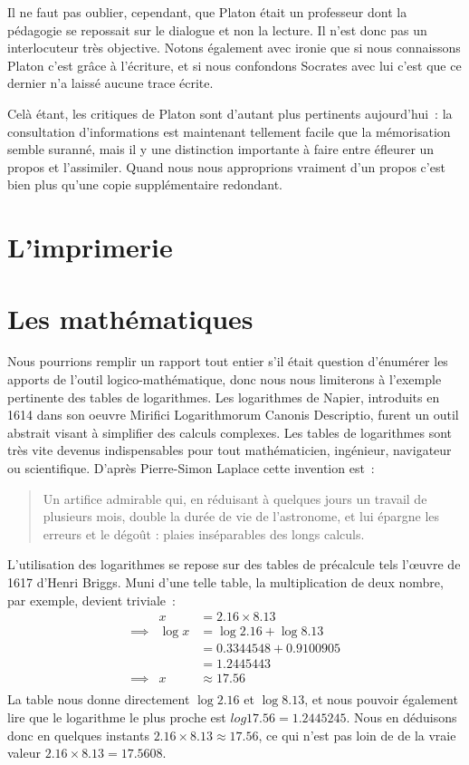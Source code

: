 Il ne faut pas oublier, cependant, que Platon était un professeur dont la pédagogie se repossait sur le dialogue et non la lecture. Il n'est donc pas un interlocuteur très objective. Notons également avec ironie que si nous connaissons Platon c'est grâce à l'écriture, et si nous confondons Socrates avec lui c'est que ce dernier n'a laissé aucune trace écrite.

Celà étant, les critiques de Platon sont d'autant plus pertinents aujourd'hui~: la consultation d'informations est maintenant tellement facile que la mémorisation semble suranné, mais il y une distinction importante à faire entre éfleurer un propos et l'assimiler. Quand nous nous approprions vraiment d'un propos c'est bien plus qu'une copie supplémentaire redondant.

\section{L'imprimerie}


\section{Les mathématiques}
Nous pourrions remplir un rapport tout entier s'il était question d'énumérer les apports de l'outil logico-mathématique, donc nous nous limiterons à l'exemple pertinente des tables de logarithmes. Les logarithmes de Napier, introduits en 1614 dans son oeuvre \og{}Mirifici Logarithmorum Canonis Descriptio\fg{}, furent un outil abstrait visant à simplifier des calculs complexes. Les tables de logarithmes sont très vite devenus indispensables pour tout mathématicien, ingénieur, navigateur ou scientifique. D'après Pierre-Simon Laplace cette invention est\cite{history-of-astronomy}~:
\begin{quote}
Un artifice admirable qui, en réduisant à quelques jours un travail de plusieurs mois, double la durée de vie de l'astronome, et lui épargne les erreurs et le dégoût : plaies inséparables des longs calculs.
\end{quote}
L'utilisation des logarithmes se repose sur des tables de précalcule tels l'\oe{}uvre de 1617 d'Henri Briggs. Muni d'une telle table, la multiplication de deux nombre, par exemple, devient triviale~:
\begin{eqnarray}
                    &x            &= 2.16\times{8.13}              \nonumber \\
        \implies{}  &\log{x}      &= \log{2.16}+\log{8.13}         \nonumber \\
                    &             &= 0.3344548 + 0.9100905         \nonumber \\
                    &             &= 1.2445443                     \nonumber \\
        \implies{}  &x            &\approx{17.56}                   \nonumber \\
\end{eqnarray}
La table nous donne directement $\log{2.16}$ et $\log{8.13}$, et nous pouvoir également lire que le logarithme le plus proche est $log{17.56} = 1.2445245$. Nous en déduisons donc en quelques instants $2.16\times{8.13} \approx{17.56}$, ce qui n'est pas loin de de la vraie valeur $2.16\times{8.13}={17.5608}$.

